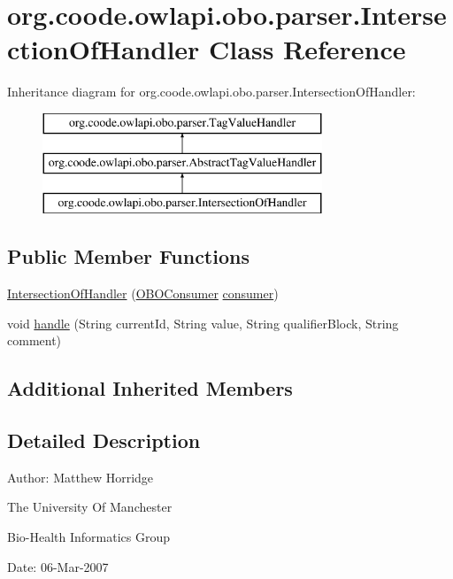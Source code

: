 \hypertarget{classorg_1_1coode_1_1owlapi_1_1obo_1_1parser_1_1_intersection_of_handler}{\section{org.\-coode.\-owlapi.\-obo.\-parser.\-Intersection\-Of\-Handler Class Reference}
\label{classorg_1_1coode_1_1owlapi_1_1obo_1_1parser_1_1_intersection_of_handler}
}
Inheritance diagram for org.\-coode.\-owlapi.\-obo.\-parser.\-Intersection\-Of\-Handler\-:\begin{figure}[H]
\begin{center}
\leavevmode
\includegraphics[height=3.000000cm]{classorg_1_1coode_1_1owlapi_1_1obo_1_1parser_1_1_intersection_of_handler}
\end{center}
\end{figure}
\subsection*{Public Member Functions}
\begin{DoxyCompactItemize}
\item 
\hyperlink{classorg_1_1coode_1_1owlapi_1_1obo_1_1parser_1_1_intersection_of_handler_a731c3694d8168b72b8906fbfdd5e7ee2}{Intersection\-Of\-Handler} (\hyperlink{classorg_1_1coode_1_1owlapi_1_1obo_1_1parser_1_1_o_b_o_consumer}{O\-B\-O\-Consumer} \hyperlink{classorg_1_1coode_1_1owlapi_1_1obo_1_1parser_1_1_abstract_tag_value_handler_ab27f1ff22d15640c5f81585f18265137}{consumer})
\item 
void \hyperlink{classorg_1_1coode_1_1owlapi_1_1obo_1_1parser_1_1_intersection_of_handler_a06a45f946c737e3483deb830721e4644}{handle} (String current\-Id, String value, String qualifier\-Block, String comment)
\end{DoxyCompactItemize}
\subsection*{Additional Inherited Members}


\subsection{Detailed Description}
Author\-: Matthew Horridge\par
 The University Of Manchester\par
 Bio-\/\-Health Informatics Group\par
 Date\-: 06-\/\-Mar-\/2007\par
\par
 

